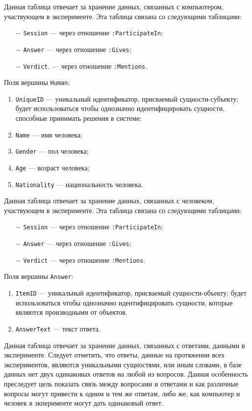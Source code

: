 Данная таблица отвечает за хранение данных, связанных с компьютером, участвующем в эксперименте. 
Эта таблица связана со следующими таблицами:
\begin{itemize}
    \item[$-$] \texttt{Session} --- через отношение \texttt{:ParticipateIn};
    \item[$-$] \texttt{Answer} --- через отношение \texttt{:Gives};
    \item[$-$] \texttt{Verdict}. --- через отношение \texttt{:Mentions}.
\end{itemize}

Поля вершины \texttt{Human}:
\begin{enumerate}
    \item \texttt{UniqueID} --- уникальный идентификатор, присваемый сущности-субъекту; будет использоваться чтобы однозначно идентифицировать сущности, способные принимать решения в системе;  
    \item \texttt{Name} --- имя человека;
    \item \texttt{Gender} --- пол человека;
    \item \texttt{Age} --- возраст человека; 
    \item \texttt{Nationality} --- национальность человека.
\end{enumerate}

Данная таблица отвечает за хранение данных, связанных с человеком, участвующем в эксперименте. 
Эта таблица связана со следующими таблицами:
\begin{itemize}
    \item[$-$] \texttt{Session} --- через отношение \texttt{:ParticipateIn};
    \item[$-$] \texttt{Answer} --- через отношение \texttt{:Gives};
    \item[$-$] \texttt{Verdict} --- через отношение \texttt{:Mentions}.
\end{itemize}

Поля вершины \texttt{Answer}:
\begin{enumerate}
    \item \texttt{ItemID} --- уникальный идентификатор, присваемый сущности-объекту; будет использоваться чтобы однозначно идентифицировать сущности, которые являются производными от объектов.
    \item \texttt{AnswerText} --- текст ответа.
\end{enumerate}

Данная таблица отвечает за хранение данных, связанных с ответами, данными в эксперименте. 
Следует отметить, что ответы, данные на протяжении всех экспериментов, являются уникальными сущностями, или иным словами, в базе данных нет двух одинаковых ответов на любой из вопросов.
Данная особенность преследует цель показать связь между вопросами и ответами и как различные вопросы могут привести к одним и тем же ответам, либо же, как компьютер и человек в экперименте могут дать одинаковый ответ.

